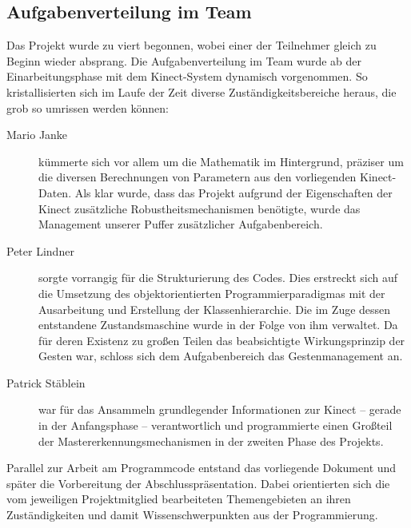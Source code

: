 	\subsection{Aufgabenverteilung im Team}
	Das Projekt wurde zu viert begonnen, wobei einer der Teilnehmer gleich zu Beginn wieder absprang. Die Aufgabenverteilung im Team wurde ab der Einarbeitungsphase mit dem Kinect-System dynamisch vorgenommen. So kristallisierten sich im Laufe der Zeit diverse Zuständigkeitsbereiche heraus, die grob so umrissen werden können:
	\begin{description}
		\item[Mario Janke] kümmerte sich vor allem um die Mathematik im Hintergrund, präziser um die diversen Berechnungen von Parametern aus den vorliegenden Kinect-Daten. Als klar wurde, dass das Projekt aufgrund der Eigenschaften der Kinect zusätzliche Robustheitsmechanismen benötigte, wurde das Management unserer Puffer zusätzlicher Aufgabenbereich.
		\item[Peter Lindner] sorgte vorrangig für die Strukturierung des Codes. Dies erstreckt sich auf die Umsetzung des objektorientierten Programmierparadigmas mit der Ausarbeitung und Erstellung der Klassenhierarchie. Die im Zuge dessen entstandene Zustandsmaschine wurde in der Folge von ihm verwaltet. Da für deren Existenz zu großen Teilen das beabsichtigte Wirkungsprinzip der Gesten war, schloss sich dem Aufgabenbereich das Gestenmanagement an.
		\item[Patrick Stäblein] war für das Ansammeln grundlegender Informationen zur Kinect -- gerade in der Anfangsphase -- verantwortlich und programmierte einen Großteil der Mastererkennungsmechanismen in der zweiten Phase des Projekts.
	\end{description}
	Parallel zur Arbeit am Programmcode entstand das vorliegende Dokument und später die Vorbereitung der Abschlusspräsentation. Dabei orientierten sich die vom jeweiligen Projektmitglied bearbeiteten Themengebieten an ihren Zuständigkeiten und damit Wissenschwerpunkten aus der Programmierung.
